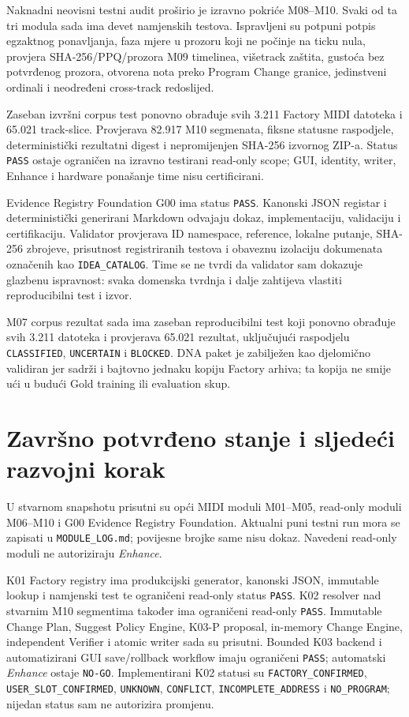 \documentclass[11pt]{article}
\begin{document}
Naknadni neovisni testni audit proširio je izravno pokriće M08--M10. Svaki od
ta tri modula sada ima devet namjenskih testova. Ispravljeni su potpuni potpis
egzaktnog ponavljanja, faza mjere u prozoru koji ne počinje na ticku nula,
provjera SHA-256/PPQ/prozora M09 timelinea, višetrack zaštita, gustoća bez
potvrđenog prozora, otvorena nota preko Program Change granice, jedinstveni
ordinali i neodređeni cross-track redoslijed.

Zaseban izvršni corpus test ponovno obrađuje svih 3.211 Factory MIDI datoteka
i 65.021 track-slice. Provjerava 82.917 M10 segmenata, fiksne statusne
raspodjele, deterministički rezultatni digest i nepromijenjen SHA-256 izvornog
ZIP-a. Status \texttt{PASS} ostaje ograničen na izravno testirani read-only
scope; GUI, identity, writer, Enhance i hardware ponašanje time nisu
certificirani.

Evidence Registry Foundation G00 ima status \texttt{PASS}. Kanonski JSON
registar i deterministički generirani Markdown odvajaju dokaz, implementaciju,
validaciju i certifikaciju. Validator provjerava ID namespace, reference,
lokalne putanje, SHA-256 zbrojeve, prisutnost registriranih testova i obaveznu
izolaciju dokumenata označenih kao \texttt{IDEA\_CATALOG}. Time se ne tvrdi da
validator sam dokazuje glazbenu ispravnost: svaka domenska tvrdnja i dalje
zahtijeva vlastiti reproducibilni test i izvor.

M07 corpus rezultat sada ima zaseban reproducibilni test koji ponovno obrađuje
svih 3.211 datoteka i provjerava 65.021 rezultat, uključujući raspodjelu
\texttt{CLASSIFIED}, \texttt{UNCERTAIN} i \texttt{BLOCKED}. DNA paket je
zabilježen kao djelomično validiran jer sadrži i bajtovno jednaku kopiju
Factory arhiva; ta kopija ne smije ući u budući Gold training ili evaluation
skup.

\section{Završno potvrđeno stanje i sljedeći razvojni korak}

U stvarnom snapshotu prisutni su opći MIDI moduli M01--M05, read-only moduli
M06--M10 i G00 Evidence Registry Foundation. Aktualni puni testni run mora se
zapisati u \texttt{MODULE\_LOG.md}; povijesne brojke same nisu dokaz. Navedeni
read-only moduli ne autoriziraju \emph{Enhance}.

K01 Factory registry ima produkcijski generator, kanonski JSON, immutable
lookup i namjenski test te ograničeni read-only status \texttt{PASS}. K02
resolver nad stvarnim M10 segmentima također ima ograničeni read-only
\texttt{PASS}. Immutable Change Plan, Suggest Policy Engine, K03-P proposal,
in-memory Change Engine, independent Verifier i atomic writer sada su prisutni.
Bounded K03 backend i automatizirani GUI save/rollback workflow imaju
ograničeni \texttt{PASS}; automatski \emph{Enhance} ostaje \texttt{NO-GO}.
Implementirani K02 statusi su
\texttt{FACTORY\_CONFIRMED}, \texttt{USER\_SLOT\_CONFIRMED},
\texttt{UNKNOWN}, \texttt{CONFLICT}, \texttt{INCOMPLETE\_ADDRESS} i
\texttt{NO\_PROGRAM}; nijedan status sam ne autorizira promjenu.
\end{document}
